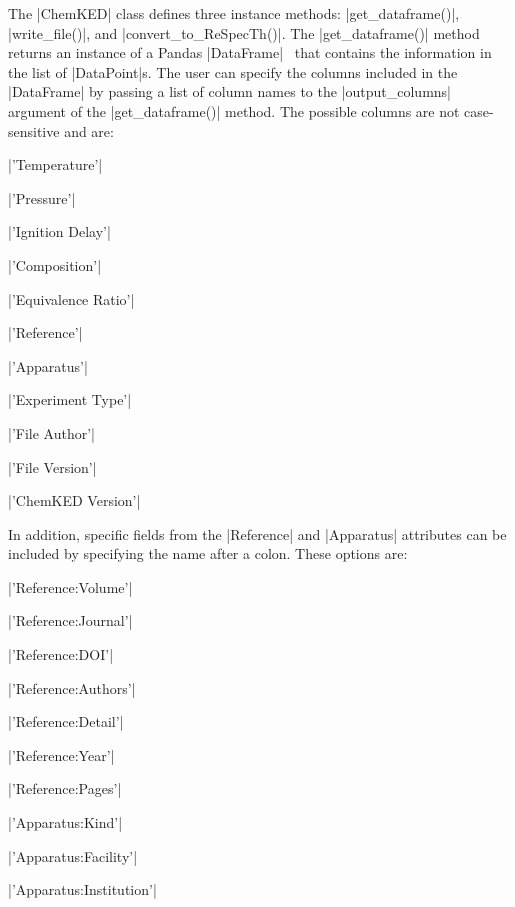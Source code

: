 \documentclass[12pt]{ijck}
\begin{document}
The \pybox|ChemKED| class defines three instance methods:
\pybox|get_dataframe()|, \pybox|write_file()|, and \pybox|convert_to_ReSpecTh()|.
The \pybox|get_dataframe()| method returns an instance of a
Pandas \pybox|DataFrame|~\autocite{pandas} that contains the information in the
list of \pybox|DataPoint|s. The user can specify the columns included in the
\pybox|DataFrame| by passing a list of column names to the
\pybox|output_columns| argument of the \pybox|get_dataframe()| method. The
possible columns are not case-sensitive and are:
%
\noindent\begin{itemize*}
    \item \pybox|'Temperature'|
    \item \pybox|'Pressure'|
    \item \pybox|'Ignition Delay'|
    \item \pybox|'Composition'|
    \item \pybox|'Equivalence Ratio'|
    \item \pybox|'Reference'|
    \item \pybox|'Apparatus'|
    \item \pybox|'Experiment Type'|
    \item \pybox|'File Author'|
    \item \pybox|'File Version'|
    \item \pybox|'ChemKED Version'|
\end{itemize*}

In addition, specific fields from the \pybox|Reference| and \pybox|Apparatus|
attributes can be included by specifying the name after a colon. These options
are:
%
\noindent\begin{itemize*}
    \item \pybox|'Reference:Volume'|
    \item \pybox|'Reference:Journal'|
    \item \pybox|'Reference:DOI'|
    \item \pybox|'Reference:Authors'|
    \item \pybox|'Reference:Detail'|
    \item \pybox|'Reference:Year'|
    \item \pybox|'Reference:Pages'|
    \item \pybox|'Apparatus:Kind'|
    \item \pybox|'Apparatus:Facility'|
\end{itemize*}

\noindent\begin{itemize*}
    \item \pybox|'Apparatus:Institution'|
\end{itemize*}
\end{document}
